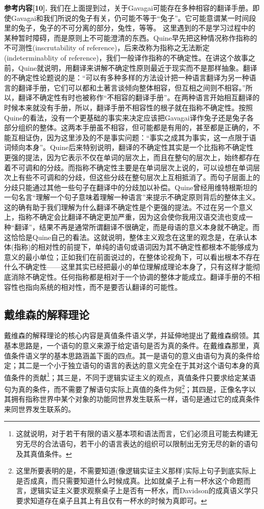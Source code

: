 \documentclass{article}
\begin{document}
\textbf{\kaishu 参考内容[10].}
{
我们在上面提到过，关于Gavagai可能存在多种相容的翻译手册。即使Gavagai和我们所说的兔子有关，仍可能不等于“兔子”。它可能意谓某一时间段里的兔子，兔子的不可分离的部分，兔性，等等。
这里遇到的不是学习过程中的某种暂时障碍，而是原则上不可能澄清的东西。Quine早先把这种情况称作指称的不可测性(inscrutability of reference)，后来改称为指称之无法断定(indeterminablity of reference)，我们一般译作指称的不确定性。在讲这个故事之前，Quine就说明，用翻译来讲解不确定性原则最近于现实而不是那样抽象。翻译的不确定性论题说的是：“可以有多种多样的方法设计把一种语言翻译为另一种语言的翻译手册，它们可以都和土著言谈倾向整体相容，但互相之间则不相容。”所以，翻译不确定性有时也被称作“不相容的翻译手册”。在两种语言开始相互翻译的时候本来就没有手册，所以，翻译手册不相容性的根子就在指称不确定性。按照Quine的看法，没有一个更基础的事实来决定应该把Gavagai译作兔子还是兔子各部分组织的整体。这两本手册虽不相容，但可能都是有用的，甚至都是正确的，不能互相证伪，因为这里涉及的不是事实问题：“事实之成其为事实，这一点限于语词倾向本身”。Quine后来特别说明，翻译的不确定性其实是一个比指称不确定性更强的提法，因为它表示不仅在单词的层次上，而且在整句的层次上，始终都存在着不可调和的分歧。而指称不确定性主要是在单词层次上说的，可以设想在单词层次上有些不可调和的分歧，但这些分歧在整句层次上互相抵消了。而句子层面上的分歧只能通过其他一些句子在翻译中的分歧加以补偿。Quine曾经用维特根斯坦的一句名言“理解一个句子意味着理解一种语言”来提示不确定原则背后的整体主义。这的确有助于我们理解为什么翻译不确定性是个更强的提法。不过在另一个意义上，指称不确定会比翻译不确定更加严重，因为这会使你我用汉语交流也变成一种“翻译”，结果不再是通常所谓翻译不很确定，而是母语的意义本身就不确定。而这恰恰是Quine自己的看法。这就说明，整体主义观念在这里的观念是，在承认本体(指称)的相对性的前提下，单纯的语句或语词因为其不确定性都根本不能够成为意义的最小单位；正如我们在前面说过的，在整体论视角下，可以看出根本不存在什么不确定性——这里其实已经把最小的单位理解成理论本身了，只有这样才能彻底消除不确定性。任何指称都是相对于一个协调的整体才能成立。翻译手册的不相容性也指向系统的相对性，而不是要否认翻译的可能性。}
\subsection{戴维森的解释理论}
戴维森的解释理论的核心内容是真值条件语义学，并延伸地提出了{\heiti 戴维森纲领}。其基本思路是，一个语句的意义来源于给定语句是否为真的条件。在戴维森那里，真值条件语义学的基本思路涵盖下面的四点。其一是语句的意义由语句为真的条件给定；其二是一个小于独立语句的语言的表达的意义完全在于其对这个语句本身的真值条件的贡献\footnote{这就说明，对于若干有限的语义基本项和语法而言，它们必须且可能去构建无穷无尽的合法语句，若干小的语言表达的组织可以限制出无穷无尽的新的语句及其真值条件。}；其三是，不同于逻辑实证主义的观点，真值条件只要求给定某语句为真的条件，而不需要了解语句实际上真值的条件为何\footnote{这里所要表明的是，不需要知道(像逻辑实证主义那样)实际上句子到底实际上是否成真，而只需要知道什么时候成真。比如就桌子上有一杯水这个命题而言，逻辑实证主义要求观察桌子上是否有一杯水，而Davidson的成真语义学只要求知道存在桌子且其上有且仅有一杯水的时候为真即可。}；其四是，正像名字以其拥有指称世界中某个对象的功能同世界发生联系一样，语句是通过它的成真条件来同世界发生联系的。
\end{document}
